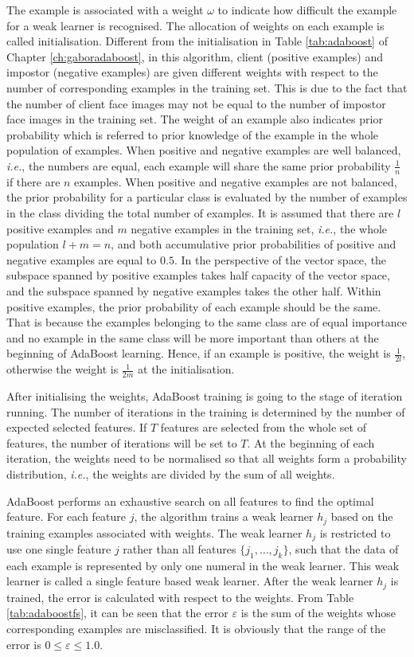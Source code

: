 The example is associated with a weight $\omega$ to indicate how difficult the example for a weak learner is recognised. The allocation of weights on each example is called initialisation. Different from the initialisation in \mbox{Table} \ref{tab:adaboost} of \mbox{Chapter} \ref{ch:gaboradaboost}, in this algorithm, client (positive examples) and impostor (negative examples) are given different weights with respect to the number of corresponding examples in the training set. This is due to the fact that the number of client face images may not be equal to the number of impostor face images in the training set. The weight of an example also indicates prior probability which is referred to prior knowledge of the example in the whole population of examples. When positive and negative examples are well balanced, \textit{i.e.}, the numbers are equal, each example will share the same prior probability $\frac{1}{n}$ if there are $n$ examples. When positive and negative examples are not balanced, the prior probability for a particular class is evaluated by the number of examples in the class dividing the total number of examples. It is assumed that there are $l$ positive examples and $m$ negative examples in the training set, \textit{i.e.}, the whole population $l+m=n$, and both accumulative prior probabilities of positive and negative examples are equal to $0.5$. In the perspective of the vector space, the subspace spanned by positive examples takes half capacity of the vector space, and the subspace spanned by negative examples takes the other half. Within positive examples, the prior probability of each example should be the same. That is because the examples belonging to the same class are of equal importance and no example in the same class will be more important than others at the beginning of AdaBoost learning. Hence, if an example is positive, the weight is $\frac{1}{2l}$, otherwise the weight is $\frac{1}{2m}$ at the initialisation.

After initialising the weights, AdaBoost training is going to the stage of iteration running. The number of iterations in the training is determined by the number of expected selected features. If $T$ features are selected from the whole set of features, the number of iterations will be set to $T$. At the beginning of each iteration, the weights need to be normalised so that all weights form a probability distribution, \textit{i.e.}, the weights are divided by the sum of all weights.

AdaBoost performs an exhaustive search on all features to find the optimal feature. For each feature $j$, the algorithm trains a weak learner $h_{j}$ based on the training examples associated with weights. The weak learner $h_{j}$ is restricted to use one single feature $j$ rather than all features $\{j_{1},\ldots,j_{k}\}$, such that the data of each example is represented by only one numeral in the weak learner. This weak learner is called a single feature based weak learner. After the weak learner $h_{j}$ is trained, the error is calculated with respect to the weights. From \mbox{Table} \ref{tab:adaboostfs}, it can be seen that the error $\varepsilon$ is the sum of the weights whose corresponding examples are misclassified. It is obviously that the range of the error is $0\le \varepsilon \le 1.0$.

